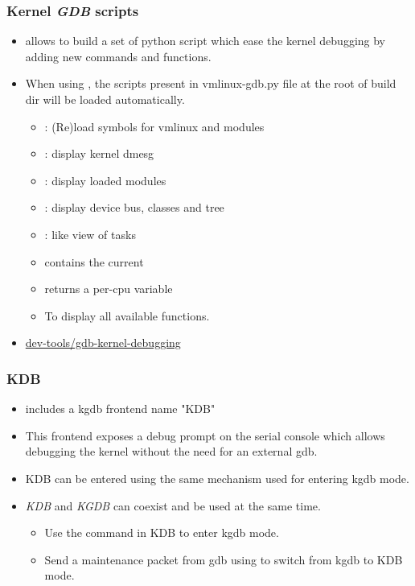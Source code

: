 \begin{frame}
  \frametitle{Kernel {\em GDB} scripts}
  \begin{itemize}
    \item {} allows to build a set of python script
          which ease the kernel debugging by adding new commands and functions.
    \item When using , the scripts present in vmlinux-gdb.py
          file at the root of build dir will be loaded automatically.
    \begin{itemize}
      \item {}: (Re)load symbols for vmlinux and modules
      \item {}: display kernel dmesg
      \item {}: display loaded modules
      \item {}: display device bus, classes and
            tree
      \item {}:  like view of tasks
      \item {} contains the current 
      \item {} returns a per-cpu variable
      \item {} To display all available functions.
    \end{itemize}
    \item \href{https://www.kernel.org/doc/html/next/dev-tools/gdb-kernel-debugging.html}{dev-tools/gdb-kernel-debugging}
  \end{itemize}
\end{frame}

\begin{frame}
  \frametitle{KDB}
  \begin{itemize}
    \item {} includes a kgdb frontend name "KDB"
    \item This frontend exposes a debug prompt on the serial console which
          allows debugging the kernel without the need for an external gdb.
    \item KDB can be entered using the same mechanism used for entering kgdb
          mode.
    \item {\em KDB} and {\em KGDB} can coexist and be used at the same time.
    \begin{itemize}
      \item Use the  command in KDB to enter kgdb mode.
      \item Send a maintenance packet from gdb using 
            to switch from kgdb to KDB mode.
    \end{itemize}
  \end{itemize}
\end{frame}


